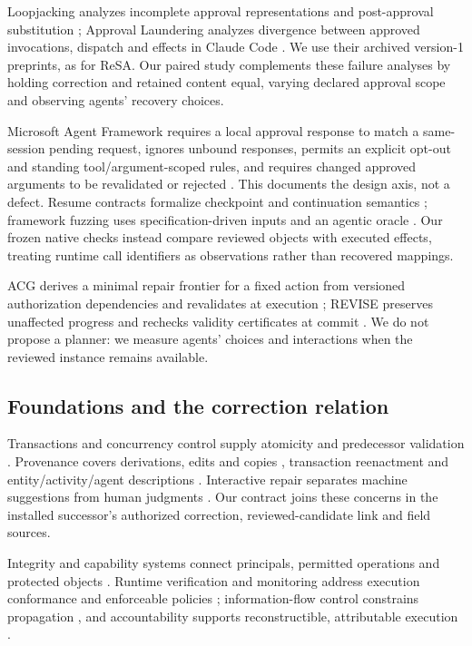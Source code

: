 \documentclass[pdflatex,sn-basic]{sn-jnl}
\begin{document}
Loopjacking analyzes incomplete approval representations and post-approval substitution \citep{kumar2026loopjacking}; Approval Laundering analyzes divergence between approved invocations, dispatch and effects in Claude Code \citep{wang2026approval}. We use their archived version-1 preprints, as for ReSA. Our paired study complements these failure analyses by holding correction and retained content equal, varying declared approval scope and observing agents' recovery choices.

Microsoft Agent Framework requires a local approval response to match a same-session pending request, ignores unbound responses, permits an explicit opt-out and standing tool/argument-scoped rules, and requires changed approved arguments to be revalidated or rejected \citep{msaf-tool-approval}. This documents the design axis, not a defect. Resume contracts formalize checkpoint and continuation semantics \citep{resume-means-resume}; framework fuzzing uses specification-driven inputs and an agentic oracle \citep{logicunter}. Our frozen native checks instead compare reviewed objects with executed effects, treating runtime call identifiers as observations rather than recovered mappings.

ACG derives a minimal repair frontier for a fixed action from versioned authorization dependencies and revalidates at execution \citep{wang2026acg}; REVISE preserves unaffected progress and rechecks validity certificates at commit \citep{qi2026revise}. We do not propose a planner: we measure agents' choices and interactions when the reviewed instance remains available.

\subsection{Foundations and the correction relation}\label{foundations-and-the-correction-relation}

Transactions and concurrency control supply atomicity and predecessor validation \citep{gray-transaction,kung-occ}. Provenance covers derivations, edits and copies \citep{buneman-provenance,cheney-provenance,buneman-curated}, transaction reenactment \citep{arab-reenactment} and entity/activity/agent descriptions \citep{prov-dm}. Interactive repair separates machine suggestions from human judgments \citep{yakout-guided-repair,falcon-cleaning}. Our contract joins these concerns in the installed successor's authorized correction, reviewed-candidate link and field sources.

Integrity and capability systems connect principals, permitted operations and protected objects \citep{clark-wilson,hardy-confused-deputy,miller-robust-composition}. Runtime verification and monitoring address execution conformance and enforceable policies \citep{runtime-verification,policy-enforcement}; information-flow control constrains propagation \citep{ifc}, and accountability supports reconstructible, attributable execution \citep{accountability}.
\end{document}
